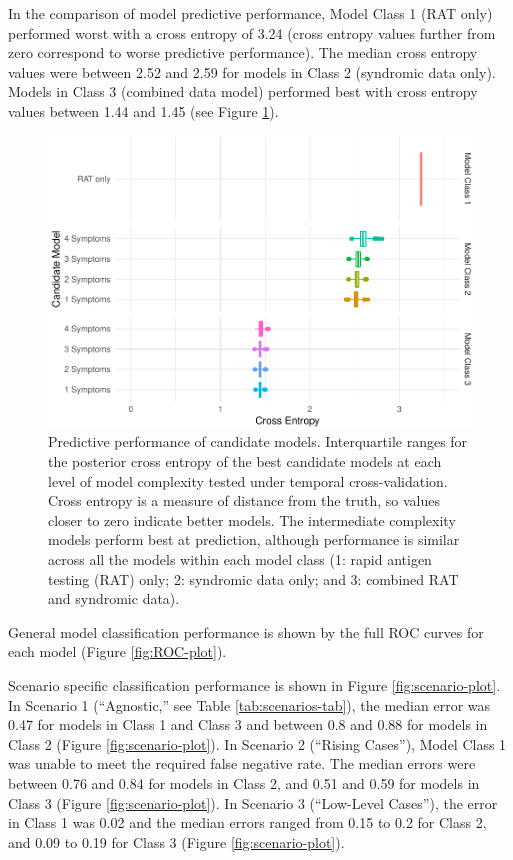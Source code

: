 \documentclass[]{elsarticle} %
\begin{document}
In the comparison of model predictive performance, Model Class 1 (RAT only) performed worst with a cross entropy of 3.24 (cross entropy values further from zero correspond to worse predictive performance).
The median cross entropy values were between 2.52 and 2.59 for models in Class 2 (syndromic data only).
Models in Class 3 (combined data model) performed best with cross entropy values between 1.44 and 1.45 (see Figure \ref{fig:pred-perf}).

\begin{figure}
\centering
\includegraphics{0501_MainText_files/figure-latex/pred-perf-1.pdf}
\caption{\label{fig:pred-perf}Predictive performance of candidate models. Interquartile ranges for the posterior cross entropy of the best candidate models at each level of model complexity tested under temporal cross-validation. Cross entropy is a measure of distance from the truth, so values closer to zero indicate better models. The intermediate complexity models perform best at prediction, although performance is similar across all the models within each model class (1: rapid antigen testing (RAT) only; 2: syndromic data only; and 3: combined RAT and syndromic data).}
\end{figure}

General model classification performance is shown by the full ROC curves for each model (Figure \ref{fig:ROC-plot}).

Scenario specific classification performance is shown in Figure \ref{fig:scenario-plot}.
In Scenario 1 (``Agnostic,'' see Table \ref{tab:scenarios-tab}), the median error was 0.47 for models in Class 1 and Class 3 and between 0.8 and 0.88 for models in Class 2 (Figure \ref{fig:scenario-plot}).
In Scenario 2 (``Rising Cases''), Model Class 1 was unable to meet the required false negative rate.
The median errors were between
0.76 and
0.84 for models in Class 2, and
0.51 and
0.59 for models in Class 3 (Figure \ref{fig:scenario-plot}).
In Scenario 3 (``Low-Level Cases''), the error in Class 1 was 0.02 and the median errors ranged from 0.15 to 0.2 for Class 2, and 0.09 to 0.19 for Class 3 (Figure \ref{fig:scenario-plot}).
\end{document}
